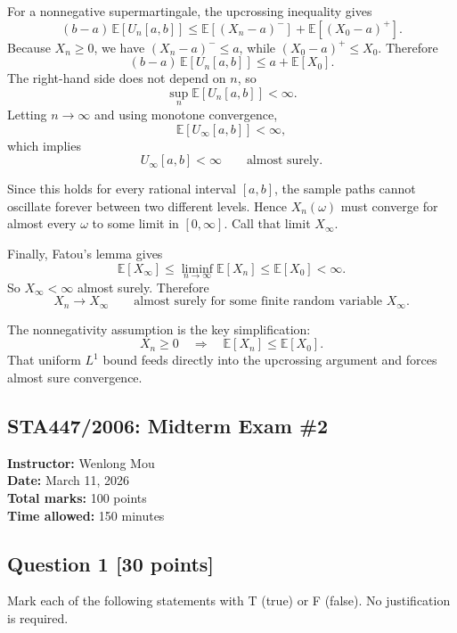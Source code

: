 \documentclass[11pt]{article}
\theoremstyle{definition}
\begin{document}
For a nonnegative supermartingale, the upcrossing inequality gives
\[
(b-a)\,\mathbb E[U_n[a,b]]
\le
\mathbb E[(X_n-a)^-]+\mathbb E[(X_0-a)^+].
\]
Because \(X_n\ge 0\), we have \((X_n-a)^-\le a\), while \((X_0-a)^+\le X_0\). Therefore
\[
(b-a)\,\mathbb E[U_n[a,b]]
\le
a+\mathbb E[X_0].
\]
The right-hand side does not depend on \(n\), so
\[
\sup_n \mathbb E[U_n[a,b]]<\infty.
\]
Letting \(n\to\infty\) and using monotone convergence,
\[
\mathbb E[U_\infty[a,b]]<\infty,
\]
which implies
\[
U_\infty[a,b]<\infty
\qquad \text{almost surely.}
\]

Since this holds for every rational interval \([a,b]\), the sample paths cannot oscillate forever between two different levels. Hence \(X_n(\omega)\) must converge for almost every \(\omega\) to some limit in \([0,\infty]\). Call that limit \(X_\infty\).

Finally, Fatou's lemma gives
\[
\mathbb E[X_\infty]
\le
\liminf_{n\to\infty}\mathbb E[X_n]
\le
\mathbb E[X_0]
<
\infty.
\]
So \(X_\infty<\infty\) almost surely. Therefore
\[
\boxed{
X_n\to X_\infty
\qquad \text{almost surely for some finite random variable } X_\infty.
}
\]

\begin{summarybox}
The nonnegativity assumption is the key simplification:
\[
X_n\ge 0
\quad \Longrightarrow \quad
\mathbb E[X_n]\le \mathbb E[X_0].
\]
That uniform \(L^1\) bound feeds directly into the upcrossing argument and forces almost sure convergence.
\end{summarybox}

\clearpage

\subsection*{STA447/2006: Midterm Exam \#2}
\textbf{Instructor:} Wenlong Mou\\
\textbf{Date:} March 11, 2026\\
\textbf{Total marks:} 100 points\\
\textbf{Time allowed:} 150 minutes

\subsection*{Question 1 \hfill [30 points]}
Mark each of the following statements with T (true) or F (false). No justification is required.
\end{document}
